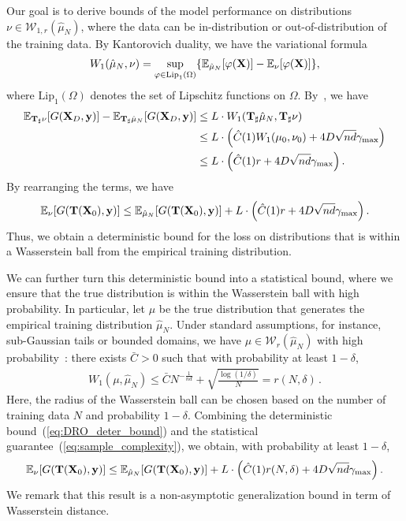\documentclass[journal]{IEEEtran}
\def\eqref#1{equation~\ref{#1}}
\newcommand{\bfT}{{\bf T}}
\newcommand{\bfX}{{\bf X}}
\newcommand{\bfy}{ {\bf y}}
\newcommand{\tr}[1]{\textcolor{red}{#1}}
\renewcommand{\eqref}[1]{(\ref{#1})}
\theoremstyle{plain}
\theoremstyle{definition}
\theoremstyle{remark}
\begin{document}
Our goal is to derive bounds of the model performance on distributions $\nu \in \mathcal{W}_{1,r}(\hat{\mu}_N)$, where the data can be in-distribution or out-of-distribution of the training data. By Kantorovich duality, we have the variational formula 
\begin{align*}
    W_1(\hat{\mu}_N, \nu) = \sup_{\varphi \in \text{Lip}_1(\Omega)} \{\mathbb{E}_{\hat{\mu}_N}[\varphi(\bfX)] - \mathbb{E}_{\nu}[\varphi(\bfX)] \},
\end{align*}
where $\text{Lip}_1(\Omega)$ denotes the set of Lipschitz functions on $\Omega$. By~, we have
\begin{align}
    \mathbb{E}_{\mathbf{T}_\sharp \nu}[ G(\bfX_D,\bfy)] - \mathbb{E}_{\mathbf{T}_\sharp\hat{\mu}_N}[ G(\bfX_D,\bfy)] &\leq  L \cdot W_1(\mathbf{T}_\sharp \hat{\mu}_N, \mathbf{T}_\sharp \nu) \\
    &\leq L \cdot \left( \hat{C}(1) W_1(\mu_0,\nu_0) + 4 D \sqrt{nd} \gamma_{\rm max} \right) \\
    &\leq L \cdot \left( \hat{C}(1) r + 4 D \sqrt{nd} \gamma_{\rm max} \right).
\end{align}
By rearranging the terms, we have
\begin{equation}\label{eq:DRO_deter_bound}
    \mathbb{E}_\nu[ G(\bfT(\bfX_0),\bfy)] \le \mathbb{E}_{\hat{\mu}_N}[ G(\bfT(\bfX_0),\bfy)] +  L \cdot \left( \hat{C}(1) r + 4 D \sqrt{nd} \gamma_{\rm max} \right).
\end{equation}
Thus, we obtain a deterministic bound for the loss on distributions that is within a Wasserstein ball from the empirical training distribution.

We can further turn this deterministic bound into a statistical bound, where we ensure that the true distribution is within the Wasserstein ball with high probability. In particular, let $\mu$ be the true distribution that generates the empirical training distribution $\hat{\mu}_N$. Under standard assumptions, for instance, sub-Gaussian tails or bounded domains, we have $\mu \in \mathcal{W}_r(\hat{\mu}_N)$ with high probability~\cite{FournierGuillin2015}: there exists $\bar{C} > 0$ such that with probability at least $1-\delta$, 
\begin{align}\label{eq:sample_complexity}
    W_1(\mu, \hat{\mu}_N) \le \bar{C} N^{-\frac{1}{nd}} + \sqrt{\frac{\log(1/\delta)}{N}} = r(N,\delta)\, .
\end{align}
Here, the radius of the Wasserstein ball can be chosen based on the number of training data $N$ and probability $1-\delta$. Combining the deterministic bound~\eqref{eq:DRO_deter_bound} and the statistical guarantee~\eqref{eq:sample_complexity}, we obtain, with probability at least $1-\delta$, 
\begin{equation}
    \mathbb{E}_\nu[ G(\bfT(\bfX_0),\bfy)] \le \mathbb{E}_{\hat{\mu}_N}[ G(\bfT(\bfX_0),\bfy)] +  L \cdot \left( \hat{C}(1) r(N,\delta) + 4 D \sqrt{nd} \gamma_{\rm max} \right).
\end{equation}
We remark that this result is a non-asymptotic generalization bound in term of Wasserstein distance.
\end{document}
